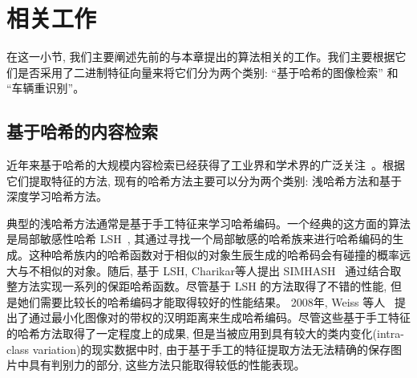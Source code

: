 \section{相关工作}
在这一小节, 我们主要阐述先前的与本章提出的算法相关的工作。我们主要根据它们是否采用了二进制特征向量来将它们分为两个类别: ``基于哈希的图像检索'' 和 ``车辆重识别''。
\subsection{基于哈希的内容检索}
近年来基于哈希的大规模内容检索已经获得了工业界和学术界的广泛关注~\cite{indyk1997locality, weiss2008spectral, gong2012iterative, heo2012spherical, jegou2010product, ge2013optimized, li2018deep}。根据它们提取特征的方法, 现有的哈希方法主要可以分为两个类别: 浅哈希方法和基于深度学习哈希方法。\par
典型的浅哈希方法通常是基于手工特征来学习哈希编码。一个经典的这方面的算法是局部敏感性哈希 LSH~\cite{indyk1997locality}, 其通过寻找一个局部敏感的哈希族来进行哈希编码的生成。这种哈希族内的哈希函数对于相似的对象生辰生成的哈希码会有碰撞的概率远大与不相似的对象。随后, 基于 LSH, Charikar等人提出 SIMHASH~\cite{charikar2002similarity} 通过结合取整方法实现一系列的保距哈希函数。尽管基于 LSH 的方法取得了不错的性能, 但是她们需要比较长的哈希编码才能取得较好的性能结果。 2008年, Weiss 等人~\cite{weiss2008spectral} 提出了通过最小化图像对的带权的汉明距离来生成哈希编码。尽管这些基于手工特征的哈希方法取得了一定程度上的成果, 但是当被应用到具有较大的类内变化(intra-class variation)的现实数据中时, 由于基于手工的特征提取方法无法精确的保存图片中具有判别力的部分, 这些方法只能取得较低的性能表现。\par
